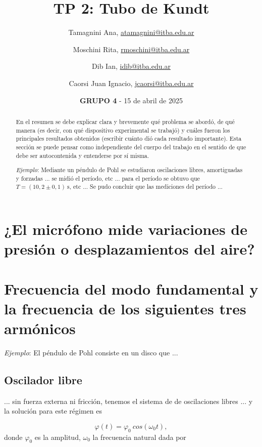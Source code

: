 \documentclass[12pt,a4paper]{article}
\title{TP 2: Tubo de Kundt}
\author{Tamagnini Ana, \href{atamagnini@itba.edu.ar}{atamagnini@itba.edu.ar} 
\and Moschini Rita, \href{rmoschini@itba.edu.ar}{rmoschini@itba.edu.ar}
\and Dib Ian, \href{idin@itba.edu.ar}{idib@itba.edu.ar}
\and Caorsi Juan Ignacio, \href{jcaorsi@itba.edu.ar}{jcaorsi@itba.edu.ar}
}
\date{\textbf{GRUPO 4} - 15 de abril de 2025}
\begin{document}
\maketitle

\begin{abstract}
En el resumen se debe explicar clara y brevemente qué problema se abordó, de qué manera (es decir, con qué dispositivo experimental se trabajó) y cuáles fueron los principales resultados obtenidos (escribir cuánto dió cada resultado importante). Esta sección se puede pensar como independiente del cuerpo del trabajo en el sentido de que debe ser autocontenida y entenderse por sí misma.

\textit{Ejemplo}: Mediante un péndulo de Pohl se estudiaron oscilaciones libres, amortiguadas y forzadas ... se midió el período, etc ... para el período se obtuvo que $T = (10,2 \pm 0,1) \ \mathrm{s}$, etc ... Se pudo concluir que las mediciones del período ...
\end{abstract}

\section{¿El micrófono mide variaciones de presión o desplazamientos del aire?}


\section{Frecuencia del modo fundamental y la frecuencia de los siguientes tres armónicos}


















\textit{Ejemplo}: El péndulo de Pohl consiste en un disco que  ...

\subsection{Oscilador libre}

... sin fuerza externa ni fricción, tenemos el sistema de de oscilaciones libres ... y la solución para este régimen es

\begin{equation}
    \varphi(t) = \varphi_0 \ cos(\omega_0 t),
\end{equation}
donde $\varphi_0$ es la amplitud, $\omega_0$ la frecuencia natural dada por
\end{document}
